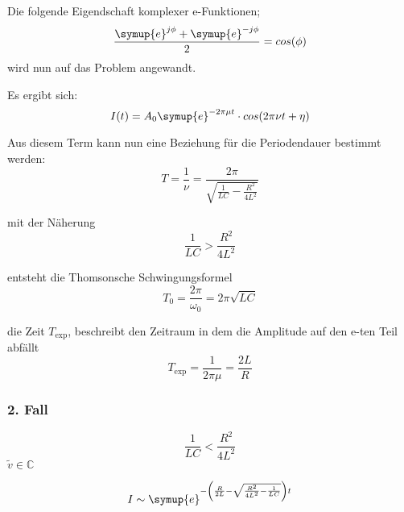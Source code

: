         Die folgende Eigendschaft komplexer e-Funktionen;
        \begin{equation}
            \frac{\symup{e}^{j \phi} + \symup{e}^{-j \phi}}{2} = cos(\phi) \nonumber
        \end{equation}
        wird nun auf das Problem angewandt.

        Es ergibt sich:
        \begin{equation}
            I(t) = A_0 \symup{e}^{- 2 \pi \mu t} \cdot cos(2\pi \nu t + \eta) \nonumber
        \end{equation}

        Aus diesem Term kann nun eine Beziehung für die Periodendauer bestimmt werden:
        \begin{equation}
            T = \frac{1}{\nu} = \frac{2 \pi}{\sqrt{\frac{1}{LC}-\frac{R^2}{4L^2}}} \nonumber
        \end{equation}

        mit der Näherung
        \begin{equation}
            \frac{1}{LC} > \frac{R^2}{4L^2} \nonumber
        \end{equation}

        entsteht die Thomsonsche Schwingungsformel
        \begin{equation}
            T_0 = \frac{2\pi}{\omega_0} = 2\pi \sqrt{LC} \nonumber
        \end{equation}

        die Zeit $T_{\text{exp}}$, beschreibt den Zeitraum in dem die Amplitude auf den e-ten Teil abfällt
        \begin{equation}
            T_{\text{exp}} = \frac{1}{2 \pi \mu } = \frac{2L}{R} \nonumber
        \end{equation}

        \subsubsection{2. Fall}

        \begin{equation}
            \frac{1}{LC} < \frac{R^2}{4L^2} \nonumber
        \end{equation}
        $\tilde{v} \in \mathds{C}$

        \begin{equation}
            I \sim \symup{e}^{- \left( \frac{R}{2L} - \sqrt{\frac{R^2}{4L^2} - \frac{1}{LC}}\right) t} \nonumber
        \end{equation}

